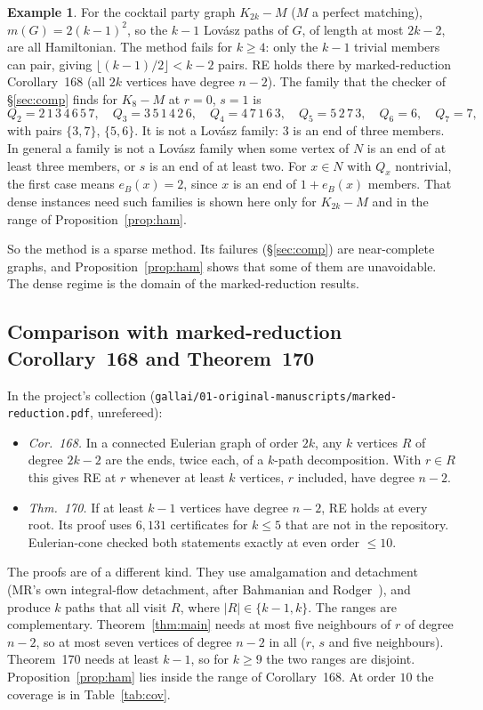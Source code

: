 \documentclass[11pt]{amsart}
\theoremstyle{definition}
\newtheorem{example}[theorem]{Example}
\begin{document}
\begin{example}\label{ex:cp}
For the cocktail party graph $K_{2k}-M$ ($M$ a perfect matching), $m(G)=2(k-1)^2$, so the $k-1$
Lov\'asz paths of $G$, of length at most $2k-2$, are all Hamiltonian. The method fails for $k\ge4$:
only the $k-1$ trivial members can pair, giving $\lfloor(k-1)/2\rfloor<k-2$ pairs. RE holds there by
marked-reduction Corollary~168 (all $2k$ vertices have degree $n-2$). The family that the checker of
\S\ref{sec:comp} finds for $K_8-M$ at $r=0$, $s=1$ is
\[
Q_2=2\,1\,3\,4\,6\,5\,7,\quad Q_3=3\,5\,1\,4\,2\,6,\quad Q_4=4\,7\,1\,6\,3,\quad Q_5=5\,2\,7\,3,
\quad Q_6=6,\quad Q_7=7,
\]
with pairs $\{3,7\}$, $\{5,6\}$. It is not a Lov\'asz family: $3$ is an end of three members. In general a family is not a Lov\'asz
family when some vertex of $N$ is an end of at least three members, or $s$ is an end of at least two.
For $x\in N$ with $Q_x$ nontrivial, the first case means $e_B(x)=2$, since $x$ is an end of
$1+e_B(x)$ members. That dense instances need such families is shown here only for $K_{2k}-M$ and in
the range of Proposition~\ref{prop:ham}.
\end{example}

So the method is a sparse method. Its failures (\S\ref{sec:comp}) are near-complete graphs, and
Proposition~\ref{prop:ham} shows that some of them are unavoidable. The dense regime is the domain of
the marked-reduction results.

\subsection*{Comparison with marked-reduction Corollary~168 and Theorem~170}
In the project's collection (\texttt{gallai/01-original-manuscripts/marked-reduction.pdf},
unrefereed):
\begin{itemize}[leftmargin=*]
\item \emph{Cor.~168.} In a connected Eulerian graph of order $2k$, any $k$ vertices $R$ of degree
$2k-2$ are the ends, twice each, of a $k$-path decomposition. With $r\in R$ this gives RE at $r$
whenever at least $k$ vertices, $r$ included, have degree $n-2$.
\item \emph{Thm.~170.} If at least $k-1$ vertices have degree $n-2$, RE holds at every root. Its
proof uses $6{,}131$ certificates for $k\le5$ that are not in the repository. Eulerian-cone checked
both statements exactly at even order $\le10$.
\end{itemize}
The proofs are of a different kind. They use amalgamation and detachment (MR's own integral-flow
detachment, after Bahmanian and Rodger~\cite{BR}), and produce $k$ paths that all visit $R$, where
$|R|\in\{k-1,k\}$. The ranges are complementary. Theorem~\ref{thm:main}
needs at most five neighbours of $r$ of degree $n-2$, so at most seven vertices of degree $n-2$ in
all ($r$, $s$ and five neighbours). Theorem~170 needs at least $k-1$, so for $k\ge9$ the two ranges
are disjoint. Proposition~\ref{prop:ham} lies inside the range of Corollary~168. At order $10$ the
coverage is in Table~\ref{tab:cov}.
\end{document}
